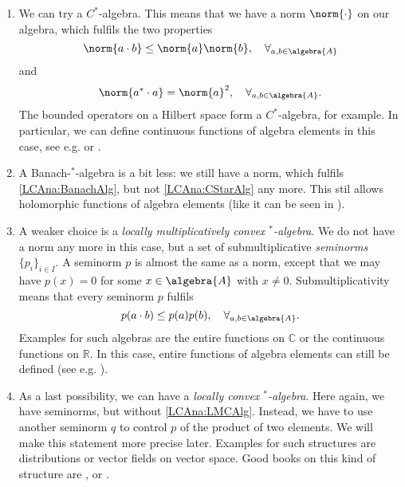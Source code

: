 \begin{enumerate}
	\item
	We can try a $C^*$-algebra. This means that we have a norm $\norm{\cdot}$ 
	on our algebra, which fulfils the two properties
	\begin{equation}
		\label{LCAna:BanachAlg}
		\norm{a \cdot b}
		\leq
		\norm{a}
		\norm{b}
		, \quad
		\forall_{a,b \in \algebra{A}}
	\end{equation}
	and
	\begin{equation}
		\label{LCAna:CStarAlg}
		\norm{a^* \cdot a}
		=
		\norm{a}^2
		, \quad
		\forall_{a,b \in \algebra{A}}.
	\end{equation}
	The bounded operators on a Hilbert space form a $C^*$-algebra, for example.	
	In particular, we can define continuous functions of algebra elements in this
	case, see e.g. \cite{blackadar:2006a} or \cite{waldmann:2014a:script}.
		
	\item
	A Banach-$^*$-algebra is a bit less: we still have a norm, which fulfils
	\eqref{LCAna:BanachAlg}, but not \eqref{LCAna:CStarAlg} any more. This stil 
	allows holomorphic functions of algebra elements (like it can be seen in 
	\cite{rudin:1991a}).

	\item
	A weaker choice is a \emph{locally multiplicatively convex 
	$^*$-algebra}. We do not have a norm any more in this case, but a set of 
	submultiplicative \emph{seminorms} $\{p_i\}_{i \in I}$. A seminorm $p$ is 
	almost the same as a norm, except that we may have $p(x) = 0$ for some $x \in 
	\algebra{A}$ with $x \neq 0$. Submultiplicativity means that every seminorm
	$p$ fulfils
	\begin{equation}
		\label{LCAna:LMCAlg}
		p(a \cdot b)
		\leq
		p(a)
		p(b)
		, \quad
		\forall_{a,b \in \algebra{A}}.
	\end{equation}
	Examples for such algebras are the entire functions on $\mathbb{C}$ or the 
	continuous functions on $\mathbb{R}$. In this case, entire functions of 
	algebra elements can still be defined (see e.g. \cite{michael:1952a}).
	
	\item
	As a last possibility, we can have a \emph{locally convex $^*$-algebra}. 
	Here again, we have seminorms, but without \eqref{LCAna:LMCAlg}. Instead, we 
	have to use another seminorm $q$ to control $p$ of the product of two 
	elements. We will make this statement more precise later. Examples for such 
	structures are distributions or vector fields on vector space. Good books on 
	this kind of structure are \cite{hoermander:2003a}, \cite{rudin:1991a} or 
	\cite{jarchow:1981a}.
\end{enumerate}
